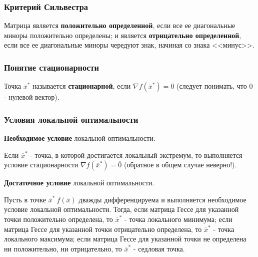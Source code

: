 \documentclass[a4paper,12pt]{report}
\begin{document}
\subsubsection{Критерий Сильвестра}
Матрица является \textbf{положительно определенной}, если все ее диагональные миноры положительно определены; и является \textbf{отрицательно определенной}, если все ее диагональные миноры чередуют знак, начиная со знака <<минус>>.

\subsubsection{Понятие стационарности}
Точка $\overline{x}^{*}$ называется \textbf{стационарной}, если $\nabla f(\overline{x}^{*}) = \overline{0}$ (следует понимать, что $\overline{0}$ - нулевой вектор).

\subsubsection{Условия локальной оптимальности}
\textbf{Необходимое условие} локальной оптимальности. 

Если $\overline{x}^{*}$ - точка, в которой достигается локальный экстремум, то выполняется условие стационарности $\nabla f(\overline{x}^{*}) = \overline{0}$ (обратное в общем случае неверно!).

\textbf{Достаточное условие} локальной оптимальности.

Пусть в точке $\overline{x}^{*}\ f(\overline{x})$ дважды дифференцируема и выполняется необходимое условие локальной оптимальности. Тогда, если матрица Гессе для указанной точки положительно определена, то $\overline{x}^{*}$ - точка локального минимума; если матрица Гессе для указанной точки отрицательно определена, то $\overline{x}^{*}$ - точка локального максимума; если матрица Гессе для указанной точки не определена ни положительно, ни отрицательно, то $\overline{x}^{*}$ - седловая точка.\\
\end{document}
